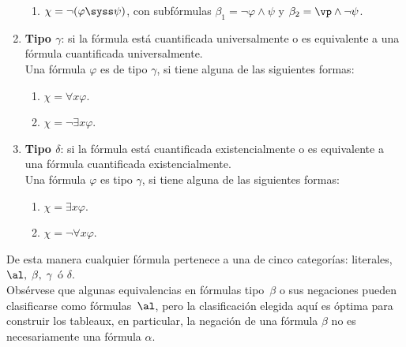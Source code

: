 \documentclass[11pt,letterpaper]{article}
\begin{document}
\begin{definicion}
\begin{enumerate}
\begin{enumerate}
   \item $\chi = \lnot ( \varphi \syss \psi)$, con subfórmulas  
   $\beta_{1} = \lnot \varphi \land  \psi$ y $\beta_{2} = \vp\land \lnot \psi$.
   \end{enumerate}

  \item[] \textbf{Tipo $\gamma$}: si la fórmula está cuantificada universalmente 
  o es equivalente a una fórmula cuantificada universalmente. \\
  Una fórmula $\varphi$ es de tipo $\gamma$, si tiene alguna de las 
  siguientes formas:
  \begin{enumerate}
   \item  $\chi = \forall x \varphi$.
   \item  $\chi = \lnot \exists x \varphi$.
    \end{enumerate}

 \item[] \textbf{Tipo $\delta$}: si la fórmula está cuantificada 
  existencialmente o es equivalente a una fórmula cuantificada 
  existencialmente. \\
  Una fórmula $\varphi$ es tipo $\gamma$, si tiene alguna de las  siguientes 
  formas:
  \begin{enumerate}
   \item  $\chi = \exists x \varphi$.
   \item  $\chi = \lnot \forall x \varphi$.
  \end{enumerate}
\end{enumerate}
\end{definicion}
De esta manera cualquier fórmula pertenece a una de cinco categor\'ias:
literales, $\al,\;\beta,\;\gamma$ ó $\delta$.\\
Obsérvese que algunas equivalencias en fórmulas tipo~$\beta$ o sus negaciones
pueden clasificarse como fórmulas~$\al$, pero la clasificación elegida aquí es 
óptima para construir los tableaux, en particular, la negación de una fórmula 
$\beta$ no es necesariamente una fórmula $\alpha$.


\end{document}

